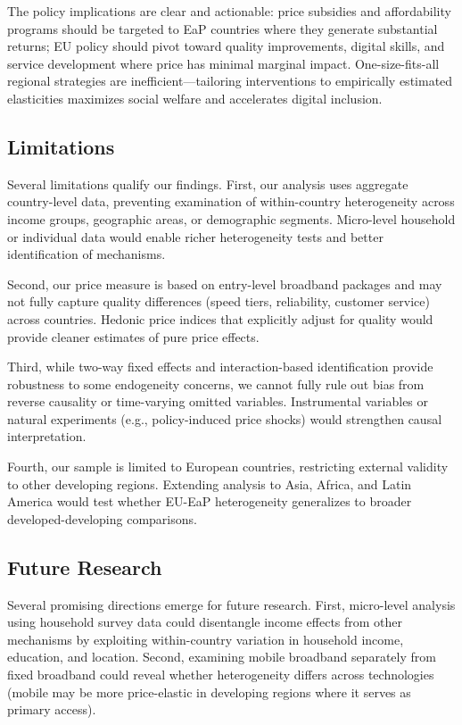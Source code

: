 \documentclass[12pt,review]{elsarticle}
\begin{document}
The policy implications are clear and actionable: price subsidies and affordability programs should be targeted to EaP countries where they generate substantial returns; EU policy should pivot toward quality improvements, digital skills, and service development where price has minimal marginal impact. One-size-fits-all regional strategies are inefficient—tailoring interventions to empirically estimated elasticities maximizes social welfare and accelerates digital inclusion.

\subsection{Limitations}

Several limitations qualify our findings. First, our analysis uses aggregate country-level data, preventing examination of within-country heterogeneity across income groups, geographic areas, or demographic segments. Micro-level household or individual data would enable richer heterogeneity tests and better identification of mechanisms.

Second, our price measure is based on entry-level broadband packages and may not fully capture quality differences (speed tiers, reliability, customer service) across countries. Hedonic price indices that explicitly adjust for quality would provide cleaner estimates of pure price effects.

Third, while two-way fixed effects and interaction-based identification provide robustness to some endogeneity concerns, we cannot fully rule out bias from reverse causality or time-varying omitted variables. Instrumental variables or natural experiments (e.g., policy-induced price shocks) would strengthen causal interpretation.

Fourth, our sample is limited to European countries, restricting external validity to other developing regions. Extending analysis to Asia, Africa, and Latin America would test whether EU-EaP heterogeneity generalizes to broader developed-developing comparisons.

\subsection{Future Research}

Several promising directions emerge for future research. First, micro-level analysis using household survey data could disentangle income effects from other mechanisms by exploiting within-country variation in household income, education, and location. Second, examining mobile broadband separately from fixed broadband could reveal whether heterogeneity differs across technologies (mobile may be more price-elastic in developing regions where it serves as primary access).
\end{document}
